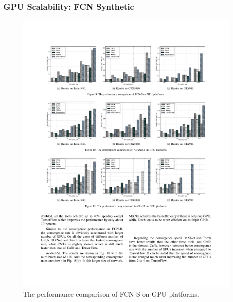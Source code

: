 \begin{frame}
	\MyLogo
	\frametitle{GPU Scalability: FCN Synthetic}

	\begin{figure}[htbp] 
		\includegraphics[width=\linewidth]{figures/FCN-S2.pdf} 
		\caption{The performance comparison of FCN-S on GPU platforms.}
	\end{figure}

\end{frame}


